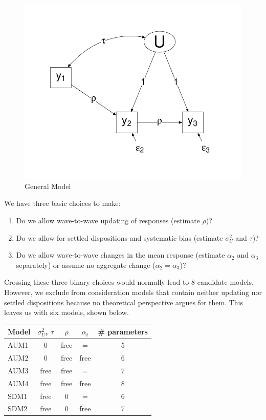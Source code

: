 \documentclass[
  11pt,
]{article}
\providecommand{\tightlist}{%
  \setlength{\itemsep}{0pt}\setlength{\parskip}{0pt}}
\begin{document}
\begin{figure}

{\centering \includegraphics[width=0.7\linewidth]{figure2} 

}

\caption{General Model}\label{fig:unnamed-chunk-1}
\end{figure}

We have three basic choices to make:

\begin{enumerate}
\def\labelenumi{\arabic{enumi}.}
\tightlist
\item
  Do we allow wave-to-wave updating of responses (estimate \(\rho\))?
\item
  Do we allow for settled dispositions and systematic bias (estimate \(\sigma^2_U\) and \(\tau\))?
\item
  Do we allow wave-to-wave changes in the mean response (estimate \(\alpha_2\) and \(\alpha_3\) separately) or assume no aggregate change (\(\alpha_2 = \alpha_3\))?
\end{enumerate}

Crossing these three binary choices would normally lead to 8 candidate models. However, we exclude from consideration models that contain neither updating nor settled dispositions because no theoretical perspective argues for them. This leaves us with six models, shown below.

\begin{longtable}[]{@{}lcccc@{}}
\toprule
Model & \(\sigma^2_U\), \(\tau\) & \(\rho\) & \(\alpha_t\) & \# parameters\tabularnewline
\midrule
\endhead
AUM1 & 0 & free & = & 5\tabularnewline
AUM2 & 0 & free & free & 6\tabularnewline
AUM3 & free & free & = & 7\tabularnewline
AUM4 & free & free & free & 8\tabularnewline
SDM1 & free & 0 & = & 6\tabularnewline
SDM2 & free & 0 & free & 7\tabularnewline
\bottomrule
\end{longtable}
\end{document}
